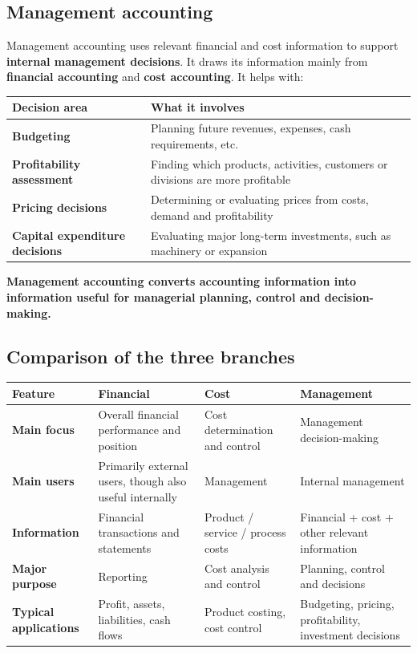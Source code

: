 \documentclass[11pt,a4paper]{article}
\begin{document}
\subsection{Management accounting}

Management accounting uses relevant financial and cost information to support \textbf{internal
management decisions}. It draws its information mainly from \textbf{financial accounting} and
\textbf{cost accounting}. It helps with:

\begin{center}
\small
\begin{tabularx}{\textwidth}{@{}l Y@{}}
\toprule
{}\textbf{Decision area} & \textbf{What it involves}\\
\midrule
\textbf{Budgeting} & Planning future revenues, expenses, cash requirements, etc.\\
\textbf{Profitability assessment} & Finding which products, activities, customers or divisions are more profitable\\
\textbf{Pricing decisions} & Determining or evaluating prices from costs, demand and profitability\\
\textbf{Capital expenditure decisions} & Evaluating major long-term investments, such as machinery or expansion\\
\bottomrule
\end{tabularx}
\end{center}

\begin{keybox}
\textbf{Management accounting converts accounting information into information useful for
managerial planning, control and decision-making.}
\end{keybox}

\subsection{Comparison of the three branches}

\begin{center}
\small
\begin{tabularx}{\textwidth}{@{}l Y Y Y@{}}
\toprule
{}\textbf{Feature} & \textbf{Financial} & \textbf{Cost} & \textbf{Management}\\
\midrule
\textbf{Main focus} & Overall financial performance and position & Cost determination and control & Management decision-making\\
\textbf{Main users} & Primarily external users, though also useful internally & Management & Internal management\\
\textbf{Information} & Financial transactions and statements & Product / service / process costs & Financial + cost + other relevant information\\
\textbf{Major purpose} & Reporting & Cost analysis and control & Planning, control and decisions\\
\textbf{Typical applications} & Profit, assets, liabilities, cash flows & Product costing, cost control & Budgeting, pricing, profitability, investment decisions\\
\bottomrule
\end{tabularx}
\end{center}
\end{document}
